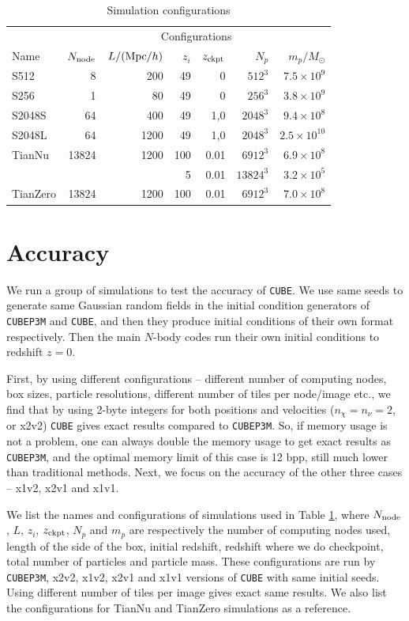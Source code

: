 \documentclass[10pt,twocolumn,preprint]{emulateapj}
\newcommand{\Msun}{M_\odot}
\begin{document}
\begin{table}[]
\centering
\caption{Simulation configurations}
\label{t.sim}
\begin{tabular}{lrrrrrr}
\hline
& \multicolumn{6}{c}{Configurations}\\
\cline{2-7}
Name  & $N_{\rm node}$ & $L/({\rm Mpc}/h)$ & $z_i$ & $z_{\rm ckpt}$ & $N_p$ & $m_p/\Msun$ \\
\hline
S512   & 8     & 200   & 49 & 0    & $512^3$  & $7.5\times 10^9$    \\
S256   & 1     & 80    & 49 & 0    & $256^3$  & $3.8\times 10^9$    \\
S2048S & 64    & 400   & 49 & 1,0  & $2048^3$ & $9.4\times 10^8$    \\
S2048L & 64    & 1200  & 49 & 1,0  & $2048^3$ & $2.5\times 10^{10}$ \\
\hline
TianNu & 13824 & 1200  & 100& 0.01 & $6912^3$ & $6.9\times 10^8$\\
       &       &       & 5  & 0.01 & $13824^3$& $3.2\times 10^5$\\
TianZero & 13824 & 1200 & 100& 0.01 & $6912^3$ & $7.0\times 10^8$\\
\hline
\end{tabular}
\end{table}

\section{Accuracy}\label{s.results}
We run a group of simulations to test the accuracy of {\tt CUBE}. We use same seeds to generate same Gaussian random fields in the initial condition generators of {\tt CUBEP3M} and {\tt CUBE}, and then they produce initial conditions of their own format respectively. Then the main $N$-body codes run their own initial conditions to redshift $z=0$.

First, by using different configurations -- different number of computing nodes, box sizes, particle resolutions, different number of tiles per node/image etc., we find that by using 2-byte integers for both positions and velocities ($n_\chi=n_\nu=2$, or x2v2) {\tt CUBE} gives exact results compared to {\tt CUBEP3M}. So, if memory usage is not a problem, one can always double the memory usage to get exact results as {\tt CUBEP3M}, and the optimal memory limit of this case is 12 bpp, still much lower than traditional methods. Next, we focus on the accuracy of the other three cases -- x1v2, x2v1 and x1v1.

We list the names and configurations of simulations used in Table \ref{t.sim}, where $N_{\rm node}$, $L$, $z_i$, $z_{\rm ckpt}$, $N_p$ and $m_p$ are respectively the number of computing nodes used, length of the side of the box, initial redshift, redshift where we do checkpoint, total number of particles and particle mass. These configurations are run by {\tt CUBEP3M}, x2v2, x1v2, x2v1 and x1v1 versions of {\tt CUBE} with same initial seeds. Using different number of tiles per image gives exact same results. We also list the configurations for TianNu and TianZero \citep{2017NatAs...1E.143Y,2017RAA....17...85E} simulations as a reference.
\end{document}
